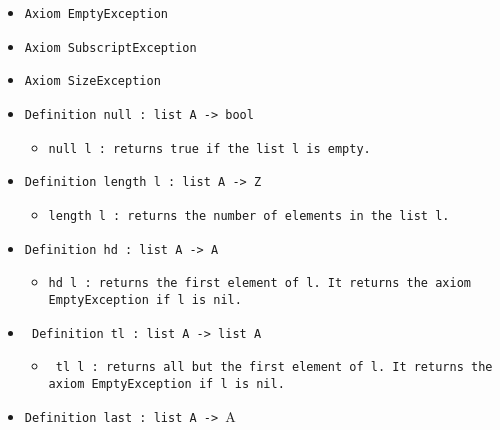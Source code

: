 \documentclass[11pt]{report}
\begin{document}
\begin{itemize}
\item  \texttt{Axiom  EmptyException}



\item  \texttt{Axiom  SubscriptException}



\item  \texttt{Axiom SizeException}



\item  \texttt{Definition null : list A -> bool}

\begin{itemize}
\item  \texttt{null l : returns true if the list l is empty.}



\end{itemize}

\item  \texttt{Definition length l : list A -> Z}

\begin{itemize}
\item  \texttt{length l : returns the number of elements in the list l.}
\end{itemize}

\item  \texttt{Definition hd : list A -> A}

\begin{itemize}
\item \begin{flushleft} \texttt{hd l : returns the first element of l. It returns the axiom EmptyException if l is nil.} \end{flushleft}



\end{itemize}

\item \texttt{ Definition tl : list A -> list A}

\begin{itemize}
\item \begin{flushleft} \texttt{ tl l : returns all but the first element of l. It returns the axiom EmptyException  if l is nil.} \end{flushleft}
\end{itemize}

\item  \texttt{Definition last : list A -> }A


\end{itemize}
\end{document}
